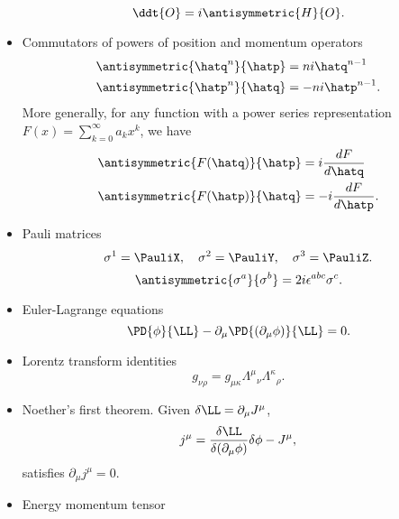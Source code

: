 \begin{itemize}
\begin{dmath}\label{eqn:usefulFormulas:220}
\ddt{O} = i \antisymmetric{H}{O}.
\end{dmath}
\item Commutators of powers of position and momentum operators
\begin{dmath}\label{eqn:usefulFormulas:240}
\begin{aligned}
\antisymmetric{\hatq^n}{\hatp} &= n i \hatq^{n-1} \\
\antisymmetric{\hatp^n}{\hatq} &= -n i \hatp^{n-1}.
\end{aligned}
\end{dmath}
More generally, for any function with a power series representation \( F(x) = \sum_{k = 0}^\infty a_k x^k \), we have
\begin{dmath}\label{eqn:usefulFormulas:260}
\begin{aligned}
\antisymmetric{F(\hatq)}{\hatp} &= i \frac{dF}{d\hatq} \\
\antisymmetric{F(\hatp)}{\hatq} &= -i \frac{dF}{d\hatp}.
\end{aligned}
\end{dmath}
\item Pauli matrices
\begin{equation}\label{eqn:usefulFormulas:280}
\sigma^1 = \PauliX, \quad
\sigma^2 = \PauliY, \quad
\sigma^3 = \PauliZ.
\end{equation}
\begin{dmath}\label{eqn:usefulFormulas:300}
\antisymmetric{\sigma^a}{\sigma^b} = 2 i \epsilon^{a b c} \sigma^c.
\end{dmath}
\item Euler-Lagrange equations
\begin{dmath}\label{eqn:usefulFormulas:320}
\PD{\phi}{\LL} - \partial_\mu \PD{(\partial_\mu \phi)}{\LL} = 0.
\end{dmath}
\item Lorentz transform identities
\begin{dmath}\label{eqn:usefulFormulas:340}
g_{\nu\rho}
=
g_{\mu \kappa}
{\Lambda^\mu}_\nu
{\Lambda^\kappa}_\rho.
\end{dmath}
\item Noether's first theorem.  Given \( \delta \LL = \partial_\mu J^\mu \), 
\begin{dmath}\label{eqn:usefulFormulas:n}
j^\mu =
\frac{\delta \LL}{\delta(\partial_\mu \phi)} \delta \phi  - J^\mu,
\end{dmath}
satisfies \( \partial_\mu j^\mu = 0 \).
\item Energy momentum tensor

\end{itemize}
